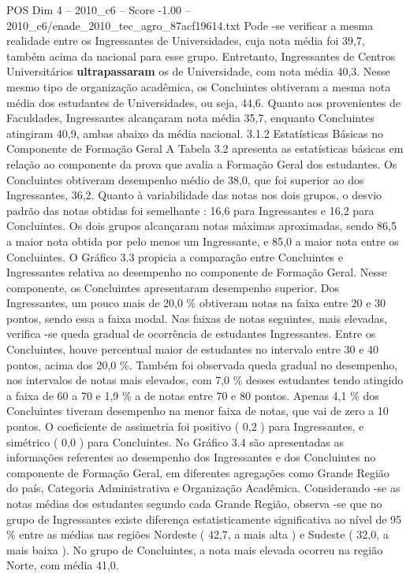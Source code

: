 \begin{textsample}{POS Dim 4 – 2010\_c6 – Score -1.00 – 2010\_c6/enade\_2010\_tec\_agro\_87acf19614.txt}
Pode -se verificar a mesma realidade entre os Ingressantes de Universidades, cuja nota média foi 39,7, também acima da nacional para esse grupo.
Entretanto, Ingressantes de Centros Universitários \textbf{ultrapassaram} os de Universidade, com nota média 40,3.
Nesse mesmo tipo de organização acadêmica, os Concluintes obtiveram a mesma nota média dos estudantes de Universidades, ou seja, 44,6.
Quanto aos provenientes de Faculdades, Ingressantes alcançaram nota média 35,7, enquanto Concluintes atingiram 40,9, ambas abaixo da média nacional. 3.1.2 Estatísticas Básicas no Componente de Formação Geral A Tabela 3.2 apresenta as estatísticas básicas em relação ao componente da prova que avalia a Formação Geral dos estudantes.
Os Concluintes obtiveram desempenho médio de 38,0, que foi superior ao dos Ingressantes, 36,2.
Quanto à variabilidade das notas nos dois grupos, o desvio padrão das notas obtidas foi semelhante : 16,6 para Ingressantes e 16,2 para Concluintes.
Os dois grupos alcançaram notas máximas aproximadas, sendo 86,5 a maior nota obtida por pelo menos um Ingressante, e 85,0 a maior nota entre os Concluintes.
O Gráfico 3.3 propicia a comparação entre Concluintes e Ingressantes relativa ao desempenho no componente de Formação Geral.
Nesse componente, os Concluintes apresentaram desempenho superior.
Dos Ingressantes, um pouco mais de 20,0 \% obtiveram notas na faixa entre 20 e 30 pontos, sendo essa a faixa modal.
Nas faixas de notas seguintes, mais elevadas, verifica -se queda gradual de ocorrência de estudantes Ingressantes.
Entre os Concluintes, houve percentual maior de estudantes no intervalo entre 30 e 40 pontos, acima dos 20,0 \%.
Também foi observada queda gradual no desempenho, nos intervalos de notas mais elevados, com 7,0 \% desses estudantes tendo atingido a faixa de 60 a 70 e 1,9 \% a de notas entre 70 e 80 pontos.
Apenas 4,1 \% dos Concluintes tiveram desempenho na menor faixa de notas, que vai de zero a 10 pontos.
O coeficiente de assimetria foi positivo ( 0,2 ) para Ingressantes, e simétrico ( 0,0 ) para Concluintes.
No Gráfico 3.4 são apresentadas as informações referentes ao desempenho dos Ingressantes e dos Concluintes no componente de Formação Geral, em diferentes agregações como Grande Região do país, Categoria Administrativa e Organização Acadêmica.
Considerando -se as notas médias dos estudantes segundo cada Grande Região, observa -se que no grupo de Ingressantes existe diferença estatisticamente significativa ao nível de 95 \% entre as médias nas regiões Nordeste ( 42,7, a mais alta ) e Sudeste ( 32,0, a mais baixa ).
No grupo de Concluintes, a nota mais elevada ocorreu na região Norte, com média 41,0.

\end{textsample}

